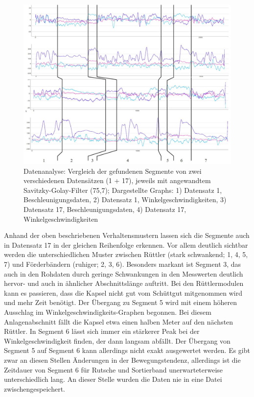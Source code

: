 \begin{figure}[htb]
	\centering
	\includegraphics[width=1\linewidth]{images/k5-segmente_vergleich.JPG}
	\caption{Datenanalyse: Vergleich der gefundenen Segmente von zwei verschiedenen Datensätzen (1 + 17), jeweils mit angewandtem Savitzky-Golay-Filter (75,7); Dargestellte Graphs: 1) Datensatz 1, Beschleunigungsdaten, 2) Datensatz 1, Winkelgeschwindigkeiten, 3) Datensatz 17, Beschleunigungsdaten, 4) Datensatz 17, Winkelgeschwindigkeiten}
	\label{fig:k5_segmente_vergleich}
\end{figure}

Anhand der oben beschriebenen Verhaltensmustern lassen sich die Segmente auch in Datensatz 17 in der gleichen Reihenfolge erkennen. Vor allem deutlich sichtbar werden die unterschiedlichen Muster zwischen Rüttler (stark schwankend; 1, 4, 5, 7) und Förderbändern (ruhiger; 2, 3, 6). Besonders markant ist Segment 3, das auch in den Rohdaten durch geringe Schwankungen in den Messwerten deutlich hervor- und auch in ähnlicher Abschnittslänge auftritt. Bei den Rüttlermodulen kann es passieren, dass die Kapsel nicht gut vom Schüttgut mitgenommen wird und mehr Zeit benötigt. Der Übergang zu Segment 5 wird mit einem höheren Ausschlag im Winkelgeschwindigkeits-Graphen begonnen. Bei diesem Anlagenabschnitt fällt die Kapsel etwa einen halben Meter auf den nächsten Rüttler. In Segment 6 lässt sich immer ein stärkerer Peak bei der Winkelgeschwindigkeit finden, der dann langsam abfällt.
Der Übergang von Segment 5 auf Segment 6 kann allerdings nicht exakt ausgewertet werden. Es gibt zwar an diesen Stellen Änderungen in der Bewegungstendenz, allerdings ist die Zeitdauer von Segment 6 für Rutsche und Sortierband unerwarteterweise unterschiedlich lang. An dieser Stelle wurden die Daten nie in eine Datei zwischengespeichert.

